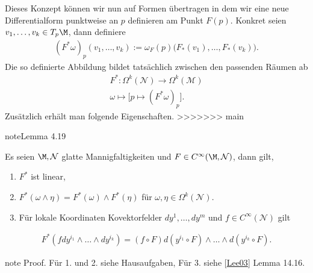 \documentclass[letterpaper,10pt,english]{jupyterBook}
\begin{document}
\sphinxAtStartPar
Dieses Konzept können wir nun auf Formen übertragen in dem wir eine neue Differentialform punktweise an \(p\) definieren am Punkt \(F(p)\). Konkret seien \(v_1,\ldots, v_k\in T_p\M\), dann definiere
\begin{equation*}
\begin{split}(F^\ast\omega)_p (v_1,\ldots,v_k) := \omega_F(p)\big(F_\ast(v_1),\ldots,F_\ast(v_k)\big).\end{split}
\end{equation*}
\sphinxAtStartPar
Die so definierte Abbildung bildet tatsächlich zwischen den passenden Räumen ab
\begin{equation*}
\begin{split}F^\ast:\Omega^k(\mathcal{N})\to\Omega^k(\mathcal{M})\\
\omega\mapsto \big[ p\mapsto (F^\ast\omega)_p \big].\end{split}
\end{equation*}
\sphinxAtStartPar
Zusätzlich erhält man folgende Eigenschaften.
\label{manifolds/diffformen:lemma-15}
>>>>>>> main
\begin{sphinxadmonition}{note}{Lemma 4.19}



\sphinxAtStartPar
Es seien \(\M,\mathcal{N}\) glatte Mannigfaltigkeiten und \(F\in C^\infty(\M,\mathcal{N})\), dann gilt,
\begin{enumerate}
%
\item {} 
\sphinxAtStartPar
\(F^\ast\) ist linear,

\item {} 
\sphinxAtStartPar
\(F^\ast(\omega\wedge\eta) = F^\ast(\omega) \wedge F^\ast(\eta)\) für \(\omega,\eta\in\Omega^k(\mathcal{N})\).

\item {} 
\sphinxAtStartPar
Für lokale Koordinaten Kovektorfelder \(dy^1,\ldots,dy^m\) und \(f\in C^\infty(\mathcal{N})\) gilt

\end{enumerate}
\begin{equation*}
\begin{split}F^\ast(f dy^{i_1}\wedge\ldots\wedge dy^{i_k}) = (f \circ F) d(y^{i_1}\circ F)\wedge\ldots\wedge d(y^{i_k}\circ F).\end{split}
\end{equation*}\end{sphinxadmonition}

\begin{sphinxadmonition}{note}
\sphinxAtStartPar
Proof. Für 1. und 2. siehe Hausaufgaben, Für 3. siehe {[}\hyperlink{cite.references:id15}{Lee03}{]} Lemma 14.16.
\end{sphinxadmonition}
\end{document}
